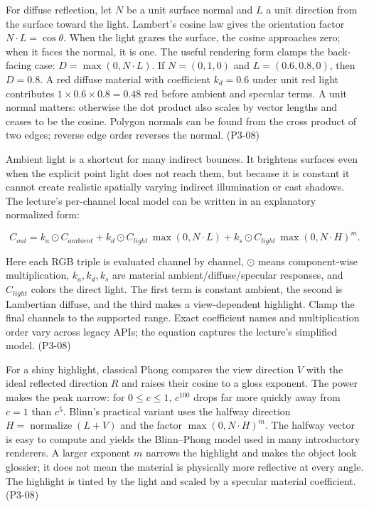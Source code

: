 For diffuse reflection, let \(N\) be a unit surface normal and \(L\) a unit direction from the surface toward the light. Lambert's cosine law gives the orientation factor \(N\cdot L=\cos\theta\). When the light grazes the surface, the cosine approaches zero; when it faces the normal, it is one. The useful rendering form clamps the back-facing case: \(D=\max(0,N\cdot L)\). If \(N=(0,1,0)\) and \(L=(0.6,0.8,0)\), then \(D=0.8\). A red diffuse material with coefficient \(k_d=0.6\) under unit red light contributes \(1\times0.6\times0.8=0.48\) red before ambient and specular terms. A unit normal matters: otherwise the dot product also scales by vector lengths and ceases to be the cosine. Polygon normals can be found from the cross product of two edges; reverse edge order reverses the normal. (P3-08)

Ambient light is a shortcut for many indirect bounces. It brightens surfaces even when the explicit point light does not reach them, but because it is constant it cannot create realistic spatially varying indirect illumination or cast shadows. The lecture's per-channel local model can be written in an explanatory normalized form:

\[
C_{out}=k_a\odot C_{ambient}+k_d\odot C_{light}\,\max(0,N\cdot L)+k_s\odot C_{light}\,\max(0,N\cdot H)^m.
\]

Here each RGB triple is evaluated channel by channel, \(\odot\) means component-wise multiplication, \(k_a,k_d,k_s\) are material ambient/diffuse/specular responses, and \(C_{light}\) colors the direct light. The first term is constant ambient, the second is Lambertian diffuse, and the third makes a view-dependent highlight. Clamp the final channels to the supported range. Exact coefficient names and multiplication order vary across legacy APIs; the equation captures the lecture's simplified model. (P3-08)

For a shiny highlight, classical Phong compares the view direction \(V\) with the ideal reflected direction \(R\) and raises their cosine to a gloss exponent. The power makes the peak narrow: for \(0\le c\le1\), \(c^{100}\) drops far more quickly away from \(c=1\) than \(c^5\). Blinn's practical variant uses the halfway direction \(H=\operatorname{normalize}(L+V)\) and the factor \(\max(0,N\cdot H)^m\). The halfway vector is easy to compute and yields the Blinn--Phong model used in many introductory renderers. A larger exponent \(m\) narrows the highlight and makes the object look glossier; it does not mean the material is physically more reflective at every angle. The highlight is tinted by the light and scaled by a specular material coefficient. (P3-08)

